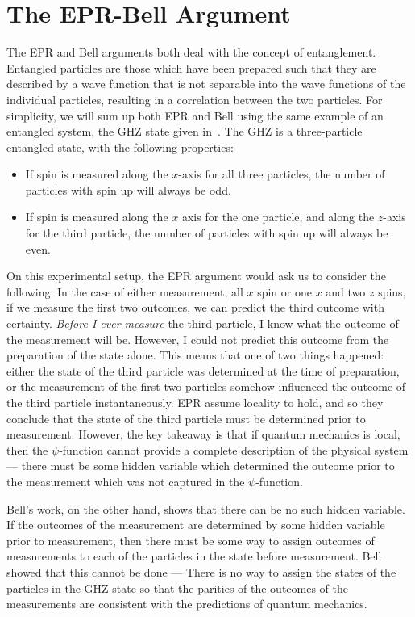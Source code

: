 \documentclass[11pt, a4paper]{article}
\begin{document}
\section{The EPR-Bell Argument}

The EPR and Bell arguments both deal with the concept of entanglement. Entangled
particles are those which have been prepared such that they are described by a
wave function that is not separable into the wave functions of the individual
particles, resulting in a correlation between the two particles. For simplicity,
we will sum up both EPR and Bell using the same example of an entangled system,
the GHZ state given in~\cite{GHZ_2007}. The GHZ is a three-particle entangled
state, with the following properties:
\begin{itemize}
    \item If spin is measured along the $x$-axis for all three particles, the 
          number of particles with spin up will always be odd.
    \item If spin is measured along the $x$ axis for the one particle, and along
          the $z$-axis for the third particle, the number of particles with spin
          up will always be even.
\end{itemize}

On this experimental setup, the EPR argument would ask us to consider the
following: In the case of either measurement, all $x$ spin or one $x$ and two
$z$ spins, if we measure the first two outcomes, we can predict the third
outcome with certainty. \textit{Before I ever measure} the third particle, I
know what the outcome of the measurement will be. However, I could not predict
this outcome from the preparation of the state alone. This means that one of two
things happened: either the state of the third particle was determined at the
time of preparation, or the measurement of the first two particles somehow
influenced the outcome of the third particle instantaneously. EPR assume
locality to hold, and so they conclude that the state of the third particle must be
determined prior to measurement. However, the key takeaway is that if quantum
mechanics is local, then the $\psi$-function cannot provide a complete
description of the physical system — there must be some hidden variable which 
determined the outcome prior to the measurement which was not captured in the 
$\psi$-function.

Bell's work, on the other hand, shows that there can be no such hidden variable.
If the outcomes of the measurement are determined by some hidden variable prior
to measurement, then there must be some way to assign outcomes of measurements 
to each of the particles in the state before measurement. Bell showed that this
cannot be done — There is no way to assign the states of the particles in the 
GHZ state so that the parities of the outcomes of the measurements are
consistent with the predictions of quantum mechanics.
\end{document}
